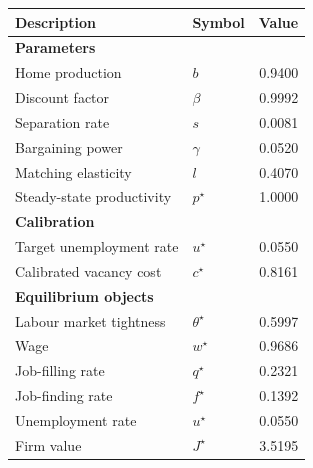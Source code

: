 \begin{tabular}{llr}
\toprule
\textbf{Description} & \textbf{Symbol} & \textbf{Value} \\
\midrule
\multicolumn{3}{l}{\textbf{Parameters}} \\
Home production            & $b$       &   0.9400 \\
Discount factor            & $\beta$  &   0.9992 \\
Separation rate            & $s$       &   0.0081 \\
Bargaining power           & $\gamma$ &   0.0520 \\
Matching elasticity        & $l$       &   0.4070 \\
Steady-state productivity  & $p^\star$ &   1.0000 \\
\midrule
\multicolumn{3}{l}{\textbf{Calibration}} \\
Target unemployment rate   & $u^\star$ &   0.0550 \\
Calibrated vacancy cost    & $c^\star$ &   0.8161 \\
\midrule
\multicolumn{3}{l}{\textbf{Equilibrium objects}} \\
Labour market tightness    & $\theta^\star$ &   0.5997 \\
Wage                       & $w^\star$       &   0.9686 \\
Job-filling rate           & $q^\star$       &   0.2321 \\
Job-finding rate           & $f^\star$       &   0.1392 \\
Unemployment rate          & $u^\star$       &   0.0550 \\
Firm value                 & $J^\star$       &   3.5195 \\
\bottomrule
\end{tabular}

